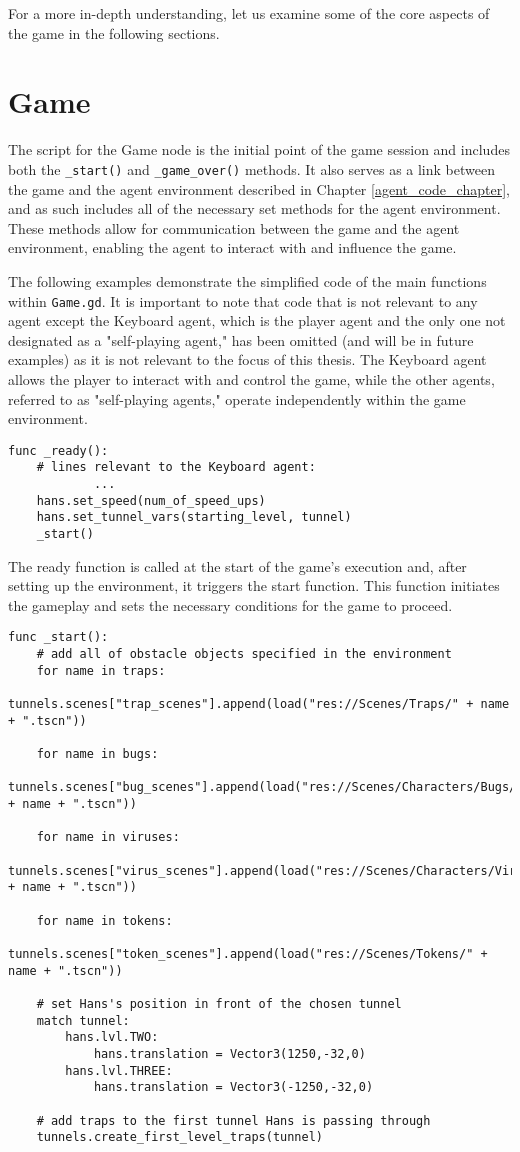 For a more in-depth understanding, let us examine some of the core aspects of the game in the following sections.

\section{Game}
The script for the Game node is the initial point of the game session and includes both the \texttt{\_start()} and \texttt{\_game\_over()} methods. It also serves as a link between the game and the agent environment described in Chapter \ref{agent_code_chapter}, and as such includes all of the necessary set methods for the agent environment. These methods allow for communication between the game and the agent environment, enabling the agent to interact with and influence the game.

The following examples demonstrate the simplified code of the main functions within \texttt{Game.gd}. It is important to note that code that is not relevant to any agent except the Keyboard agent, which is the player agent and the only one not designated as a "self-playing agent," has been omitted (and will be in future examples) as it is not relevant to the focus of this thesis. The Keyboard agent allows the player to interact with and control the game, while the other agents, referred to as "self-playing agents," operate independently within the game environment.

\begin{lstlisting}
func _ready():
    # lines relevant to the Keyboard agent:
    		...
    hans.set_speed(num_of_speed_ups)
    hans.set_tunnel_vars(starting_level, tunnel)  
    _start()
\end{lstlisting}

The ready function is called at the start of the game's execution and, after setting up the environment, it triggers the start function. This function initiates the gameplay and sets the necessary conditions for the game to proceed.

\begin{lstlisting}
func _start():
	# add all of obstacle objects specified in the environment
    for name in traps:
        tunnels.scenes["trap_scenes"].append(load("res://Scenes/Traps/" + name + ".tscn"))
        
    for name in bugs:
        tunnels.scenes["bug_scenes"].append(load("res://Scenes/Characters/Bugs/" + name + ".tscn"))
        
    for name in viruses:
        tunnels.scenes["virus_scenes"].append(load("res://Scenes/Characters/Viruses/" + name + ".tscn"))
        
    for name in tokens:
        tunnels.scenes["token_scenes"].append(load("res://Scenes/Tokens/" + name + ".tscn"))
    
    # set Hans's position in front of the chosen tunnel
    match tunnel:
        hans.lvl.TWO:
            hans.translation = Vector3(1250,-32,0)
        hans.lvl.THREE:
            hans.translation = Vector3(-1250,-32,0)
    
    # add traps to the first tunnel Hans is passing through
    tunnels.create_first_level_traps(tunnel)
\end{lstlisting}  

